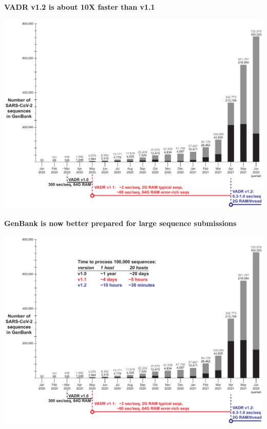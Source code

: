 \documentclass[landscape]{slides}
\begin{document}
\begin{slide}
\begin{center}
\textbf{VADR v1.2 is about 10X faster than v1.1}

\includegraphics[width=10.25in]{figs/sars-counts-jan2020-jun2021-slide2}
\end{center}

\vfill
\end{slide}
\begin{slide}
\begin{center}
\textbf{GenBank is now better prepared for large sequence submissions}

\includegraphics[width=10.25in]{figs/sars-counts-jan2020-jun2021-slide3}
\end{center}

\vfill
\end{slide}
\end{document}
